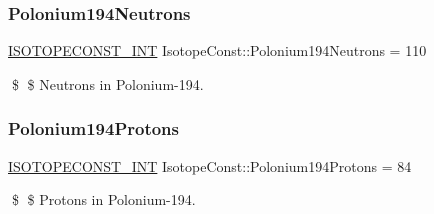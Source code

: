\subsubsection{\texorpdfstring{Polonium194\+Neutrons}{Polonium194Neutrons}}
{\footnotesize\ttfamily \mbox{\hyperlink{group___isotope_const-_macros_ga5f18360b3e99483a35c32d789e62621c}{I\+S\+O\+T\+O\+P\+E\+C\+O\+N\+S\+T\+\_\+\+I\+NT}} Isotope\+Const\+::\+Polonium194\+Neutrons = 110}

\$ \$ Neutrons in Polonium-\/194. \mbox{\label{group___isotope_const-_polonium-_po194_ga11ec2b9cb9651ef131fbd6dd05298900}} 
\subsubsection{\texorpdfstring{Polonium194\+Protons}{Polonium194Protons}}
{\footnotesize\ttfamily \mbox{\hyperlink{group___isotope_const-_macros_ga5f18360b3e99483a35c32d789e62621c}{I\+S\+O\+T\+O\+P\+E\+C\+O\+N\+S\+T\+\_\+\+I\+NT}} Isotope\+Const\+::\+Polonium194\+Protons = 84}

\$ \$ Protons in Polonium-\/194. 